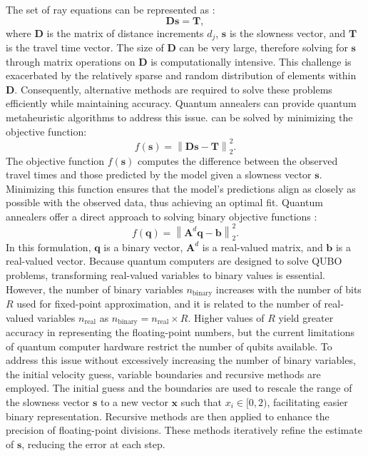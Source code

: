 The set of ray equations can be represented as \cite{mcmechan83}:
\begin{equation}
\mathbf{D} \mathbf{s} = \mathbf{T},
\label{eq:ch3-ray-system}
\end{equation}
where $\mathbf{D}$ is the matrix of distance increments $d_j$, $\mathbf{s}$ is the slowness vector, and $\mathbf{T}$ is the travel time vector. The size of $\mathbf{D}$ can be very large, therefore solving for $\mathbf{s}$ through matrix operations on $\mathbf{D}$ is computationally intensive. This challenge is exacerbated by the relatively sparse and random distribution of elements within $\mathbf{D}$. Consequently, alternative methods are required to solve these problems efficiently while maintaining accuracy. Quantum annealers can provide quantum metaheuristic algorithms to address this issue.  can be solved by minimizing the objective function:
\begin{equation}
f(\mathbf{s}) = \left\| \mathbf{D} \mathbf{s} - \mathbf{T} \right\|^2_2.
\label{eq:ch3-objective}
\end{equation}
The objective function \( f(\mathbf{s}) \) computes the difference between the observed travel times and those predicted by the model given a slowness vector $\mathbf{s}$. Minimizing this function ensures that the model's predictions align as closely as possible with the observed data, thus achieving an optimal fit.
Quantum annealers offer a direct approach to solving binary objective functions \cite{Omalley16}:
\begin{equation}
f(\mathbf{q}) = \left\| \mathbf{A}^d \mathbf{q} - \mathbf{b} \right\|^2_2.
\label{eq:ch3-binary-objective}
\end{equation}
In this formulation, $\mathbf{q}$ is a binary vector, $\mathbf{A}^d$ is a real-valued matrix, and $\mathbf{b}$ is a real-valued vector. Because quantum computers are designed to solve QUBO problems, transforming real-valued variables to binary values is essential. However, the number of binary variables $n_{\text{binary}}$ increases with the number of bits $R$ used for fixed-point approximation, and it is related to the number of real-valued variables $n_{\text{real}}$ as $n_{\text{binary}} = n_{\text{real}} \times R$.
Higher values of $R$ yield greater accuracy in representing the floating-point numbers, but the current limitations of quantum computer hardware restrict the number of qubits available. To address this issue without excessively increasing the number of binary variables, the initial velocity guess, variable boundaries \cite{Souza22} and recursive methods \cite{rogers20} are employed. The initial guess and the boundaries are used to rescale the range of the slowness vector $\mathbf{s}$ to a new vector $\mathbf{x}$ such that $x_i \in [0, 2)$, facilitating easier binary representation. Recursive methods are then applied to enhance the precision of floating-point divisions. These methods iteratively refine the estimate of $\mathbf{s}$, reducing the error at each step.
